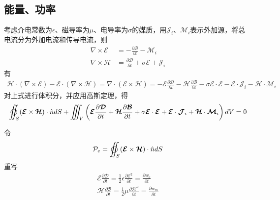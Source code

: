 \documentclass{article}
\numberwithin{equation}{section}
\renewcommand{\vec}[1]{\boldsymbol{#1}}
\begin{document}
\subsection{能量、功率}
考虑介电常数为$\epsilon$、磁导率为$\mu$、电导率为$\sigma $的媒质，用$\vec{\mathcal{J}}_i$、$\vec{\mathcal{M}}_i$表示外加源，将总电流分为外加电流和传导电流，则
\begin{align}
    \label{eq:eq30}
    \nabla \times \vec{\mathcal{E}}&=-\frac{\partial \vec{\mathcal{B}}}{\partial t}-\vec{\mathcal{M}}_i \\
    \label{eq:eq31}
    \nabla \times \vec{\mathcal{H}}&=\frac{\partial \vec{\mathcal{D}}}{\partial t}+\sigma\vec{\mathcal{E}} +\vec{\mathcal{J}}_{i}
\end{align}
有
\begin{align}
    \label{eq:eq32}
    \vec{\mathcal{H}} \cdot (\nabla \times \vec{\mathcal{E}})-\vec{\mathcal{E}} \cdot (\nabla \times \vec{\mathcal{H}})=\nabla \cdot (\vec{\mathcal{E}} \times \vec{\mathcal{H}})=-\vec{\mathcal{E}}\frac{\partial \vec{\mathcal{D}}}{\partial t}-\vec{\mathcal{H}}\frac{\partial \vec{\mathcal{B}}}{\partial t}-\sigma \vec{\mathcal{E}}\cdot \vec{\mathcal{E}}-\vec{\mathcal{E}}\cdot \vec{\mathcal{J}}_i-\vec{\mathcal{H}}\cdot \vec{\mathcal{M}}_i
\end{align}
对上式进行体积分，并应用高斯定理，得
\begin{align}
    \label{eq:eq33}
    \varoiint _S (\vec{\mathcal{E}} \times \vec{\mathcal{H}})\cdot \hat{n}dS+\iiint _V \left(\vec{\mathcal{E}}\frac{\partial \vec{\mathcal{D}}}{\partial t}+\vec{\mathcal{H}}\frac{\partial \vec{\mathcal{B}}}{\partial t}+\sigma \vec{\mathcal{E}}\cdot \vec{\mathcal{E}}+\vec{\mathcal{E}}\cdot \vec{\mathcal{J}}_i+\vec{\mathcal{H}}\cdot \vec{\mathcal{M}}_i\right)dV=0
\end{align}
\par
令
\begin{align}
    \label{eq:eq34}
    \mathcal{P}_e=\varoiint _S (\vec{\mathcal{E}} \times \vec{\mathcal{H}})\cdot \hat{n}dS
\end{align}
重写
\begin{align}
    \label{eq:eq35}
    \vec{\mathcal{E}}\frac{\partial \vec{\mathcal{D}}}{\partial t}=\frac{1}{2}\epsilon \frac{\partial \mathcal{E}^2}{\partial t}=\frac{\partial w_e}{\partial t} \\
    \label{eq:eq36}
    \vec{\mathcal{H}}\frac{\partial \vec{\mathcal{B}}}{\partial t}=\frac{1}{2}\mu \frac{\partial \mathcal{H}^2}{\partial t}=\frac{\partial w_m}{\partial t}
\end{align}
\end{document}
